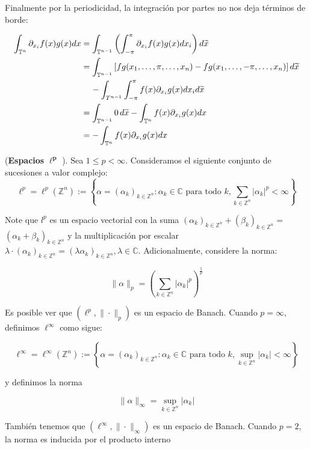\documentclass[12pt]{article}
\newcommand\Z{\ensuremath{\mathbb{Z}}}
\newcommand\T{\mathbb{T}}
\begin{document}
Finalmente por la periodicidad, la integración por partes no nos deja términos de borde:

    \begin{align*}
        \int_{\mathbb{T}^n} \partial_{x_i} f(x) g(x) d x&=\int_{\T ^{n-1}}\left(\int_{-\pi}^{\pi}\partial_{x_i} f(x) g(x)dx_{i}\right)d\widetilde{x}\\
        &=\int_{\T^{n-1}}\left[fg(x_1,\ldots,\pi,\ldots,x_n)-fg(x_1,\ldots,-\pi,\ldots,x_n)\right]d\widetilde{x}\\
        &\hspace*{0.4cm}-\int_{T^{n-1}}\int_{-\pi}^{\pi}f(x)\partial_{x_i}g(x)dx_id\widetilde{x}\\
        &=\int_{\T^{n-1}}0\,d\widetilde{x}-\int_{\T^n}f(x)\partial_{x_i}g(x)dx\\
        &=-\int_{\T^n}f(x)\partial_{x_i}g(x)dx
    \end{align*}

(\textbf{Espacios} $\mathbf{\ell^p}$ ). Sea $1 \leq p<\infty$. Consideramos el siguiente conjunto de sucesiones  a valor complejo:
$$
\ell^p=\ell^p(\mathbb{Z}^n):=\left\{\alpha=\left(\alpha_k\right)_{k \in \mathbb{Z}^n}: \alpha_k \in \mathbb{C} \text { para todo } k, \sum_{k\in \Z^n}\left|\alpha_k\right|^p<\infty\right\}
$$


Note que $l^p$ es un espacio vectorial con la suma $\left(\alpha_k\right)_{k \in \mathbb{Z}^n}+\left(\beta_k\right)_{k \in \mathbb{Z}^n}=$ $\left(\alpha_k+\beta_k\right)_{k \in \mathbb{Z}^n}$ y la multiplicación por escalar $\lambda \cdot\left(\alpha_k\right)_{k \in \mathbb{Z}^n}=\left(\lambda \alpha_k\right)_{k \in \mathbb{Z}^n}, \lambda \in \mathbb{C}$. Adicionalmente, considere la norma:

$$
\|\alpha\|_p=\left(\sum_{k\in \Z^n}\left|\alpha_k\right|^p\right)^{\frac{1}{p}}
$$


Es posible ver que $\left(\ell^p,\|\cdot\|_p\right)$ es un espacio de Banach. Cuando $p=\infty$, definimos $\ell^{\infty}$ como sigue:

$$
\ell^{\infty}=\ell^{\infty}(\mathbb{Z}^n):=\left\{\alpha=\left(\alpha_k\right)_{k \in \mathbb{Z}^n}: \alpha_k \in \mathbb{C} \text { para todo } k, \sup _{k \in \mathbb{Z}^n}\left|\alpha_k\right|<\infty\right\}
$$

y definimos la norma

$$
\|\alpha\|_{\infty}=\sup _{k \in \mathbb{Z}^n}\left|\alpha_k\right|
$$


También tenemos que $\left(\ell^{\infty},\|\cdot\|_{\infty}\right)$ es un espacio de Banach.
Cuando $p=2$, la norma es inducida por el producto interno
\end{document}
